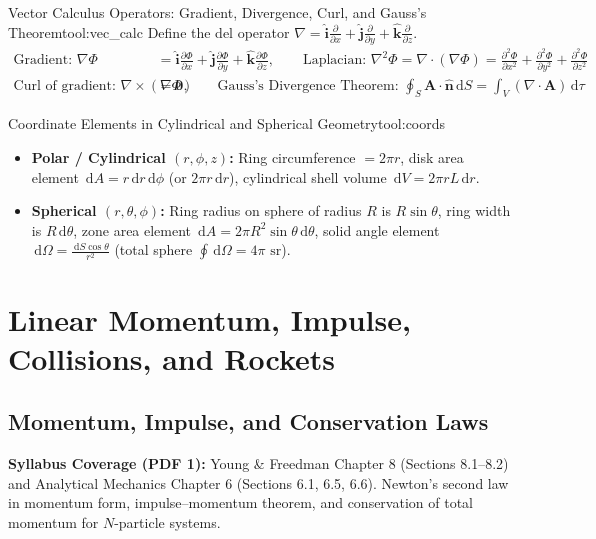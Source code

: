 \documentclass[11pt,a4paper,openany,oneside]{book}
\newcommand{\vect}[1]{\mathbf{#1}}
\newcommand{\uv}[1]{\hat{\mathbf{#1}}}
\newcommand{\ihat}{\hat{\mathbf{i}}}
\newcommand{\jhat}{\hat{\mathbf{j}}}
\newcommand{\khat}{\hat{\mathbf{k}}}
\newcommand{\dd}{\,\mathrm{d}}
\numberwithin{equation}{chapter}
\newcounter{tool}
\begin{document}
\begin{toolbox}{Vector Calculus Operators: Gradient, Divergence, Curl, and Gauss's Theorem}{tool:vec_calc}
Define the del operator $\nabla = \ihat\frac{\partial}{\partial x} + \jhat\frac{\partial}{\partial y} + \khat\frac{\partial}{\partial z}$.
\begin{align*}
  \text{Gradient: } \nabla\Phi &= \ihat\frac{\partial\Phi}{\partial x} + \jhat\frac{\partial\Phi}{\partial y} + \khat\frac{\partial\Phi}{\partial z}, \qquad \text{Laplacian: } \nabla^2\Phi = \nabla\cdot(\nabla\Phi) = \frac{\partial^2\Phi}{\partial x^2}+\frac{\partial^2\Phi}{\partial y^2}+\frac{\partial^2\Phi}{\partial z^2}\\
  \text{Curl of gradient: } \nabla\times(\nabla\Phi) &= \vect{0}, \qquad \text{Gauss's Divergence Theorem: } \oint_S \vect{A}\cdot\uv{n}\dd S = \int_V (\nabla\cdot\vect{A})\dd\tau
\end{align*}
\end{toolbox}

\begin{toolbox}{Coordinate Elements in Cylindrical and Spherical Geometry}{tool:coords}
\begin{itemize}
  \item \textbf{Polar / Cylindrical $(r,\phi,z)$:} Ring circumference $= 2\pi r$, disk area element $\dd A = r\dd r\dd\phi$ (or $2\pi r\dd r$), cylindrical shell volume $\dd V = 2\pi r L\dd r$.
  \item \textbf{Spherical $(r,\theta,\phi)$:} Ring radius on sphere of radius $R$ is $R\sin\theta$, ring width is $R\dd\theta$, zone area element $\dd A = 2\pi R^2\sin\theta\dd\theta$, solid angle element $\dd\Omega = \frac{\dd S\cos\theta}{r^2}$ (total sphere $\oint\dd\Omega = 4\pi\text{ sr}$).
\end{itemize}
\end{toolbox}

\part{Linear Momentum, Impulse, Collisions, and Rockets}

\chapter{Momentum, Impulse, and Conservation Laws}
\begin{syll}
\textbf{Syllabus Coverage (PDF 1):} Young \& Freedman Chapter 8 (Sections 8.1--8.2) and Analytical Mechanics Chapter 6 (Sections 6.1, 6.5, 6.6). Newton's second law in momentum form, impulse--momentum theorem, and conservation of total momentum for $N$-particle systems.
\end{syll}
\end{document}

